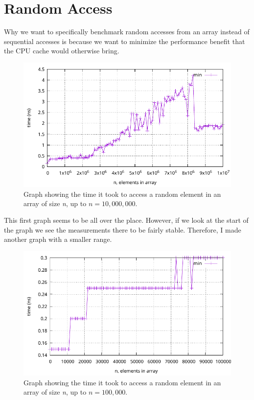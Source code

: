 \documentclass[a4paper, 11pt]{article}
\begin{document}
\section{Random Access}
	Why we want to specifically benchmark random accesses from an array instead of sequential accesses is because
	we want to minimize the performance benefit that the CPU cache would otherwise bring.
	\par
	\begin{figure}[h]
		\centering
		\includegraphics[scale=0.8]{graphs/plot2_10,000,000.pdf}
		\caption{
			Graph showing the time it took to access a random element in an array of size \textit{n}, up to \(n=10,000,000\).
		}
	\end{figure}
	This first graph seems to be all over the place. However, if we look at the start of the graph we see the measurements there to be fairly stable.
	Therefore, I made another graph with a smaller range.
	\par
	\begin{figure}[h]
		\centering
		\includegraphics[scale=0.8]{graphs/plot2_100,000.pdf}
		\caption{
			Graph showing the time it took to access a random element in an array of size \textit{n}, up to \(n=100,000\).
		}
	\end{figure}
\end{document}
